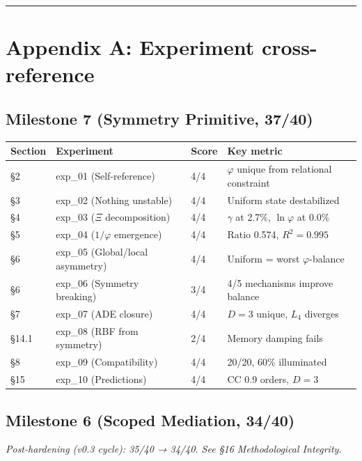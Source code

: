 \documentclass[11pt,a4paper]{article}
\begin{document}
\begin{center}\rule{0.5\linewidth}{0.4pt}\end{center}

\section*{Appendix A: Experiment cross-reference}

\subsection*{Milestone 7 (Symmetry Primitive, 37/40)}

\begin{longtable}[]{@{}llll@{}}
\toprule
Section & Experiment & Score & Key metric \\
\midrule\endhead
§2 & exp\_01 (Self-reference) & 4/4 & $\varphi$ unique from relational constraint \\
§3 & exp\_02 (Nothing unstable) & 4/4 & Uniform state destabilized \\
§4 & exp\_03 ($\Xi$ decomposition) & 4/4 & $\gamma$ at 2.7\%, $\ln\varphi$ at 0.0\% \\
§5 & exp\_04 ($1/\varphi$ emergence) & 4/4 & Ratio 0.574, $R^2 = 0.995$ \\
§6 & exp\_05 (Global/local asymmetry) & 4/4 & Uniform = worst $\varphi$-balance \\
§6 & exp\_06 (Symmetry breaking) & 3/4 & 4/5 mechanisms improve balance \\
§7 & exp\_07 (ADE closure) & 4/4 & $D = 3$ unique, $L_4$ diverges \\
§14.1 & exp\_08 (RBF from symmetry) & 2/4 & Memory damping fails \\
§8 & exp\_09 (Compatibility) & 4/4 & 20/20, 60\% illuminated \\
§15 & exp\_10 (Predictions) & 4/4 & CC 0.9 orders, $D = 3$ \\
\bottomrule
\end{longtable}

\subsection*{Milestone 6 (Scoped Mediation, 34/40)}

\emph{Post-hardening (v0.3 cycle): 35/40 → 34/40. See §16 Methodological Integrity.}
\end{document}
